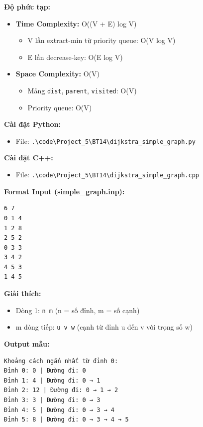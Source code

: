 \documentclass[12pt,a4paper]{article}
\begin{document}
\textbf{Độ phức tạp:}
\begin{itemize}[label=\textbullet]
   \item \textbf{Time Complexity:} O((V + E) log V)
   \begin{itemize}[label=\textendash]
       \item V lần extract-min từ priority queue: O(V log V)
       \item E lần decrease-key: O(E log V)
   \end{itemize}
   \item \textbf{Space Complexity:} O(V)
   \begin{itemize}[label=\textendash]
       \item Mảng \texttt{dist}, \texttt{parent}, \texttt{visited}: O(V)
       \item Priority queue: O(V)
   \end{itemize}
\end{itemize}

\textbf{Cài đặt Python:}
\begin{itemize}[label=\textbullet]
   \item File: \texttt{.\textbackslash code\textbackslash Project\_5\textbackslash BT14\textbackslash dijkstra\_simple\_graph.py}
\end{itemize}

\textbf{Cài đặt C++:}
\begin{itemize}[label=\textbullet]
   \item File: \texttt{.\textbackslash code\textbackslash Project\_5\textbackslash BT14\textbackslash dijkstra\_simple\_graph.cpp}
\end{itemize}
\newpage
\textbf{Format Input (simple\_graph.inp):}
\begin{verbatim}
6 7
0 1 4
1 2 8
2 5 2
0 3 3
3 4 2
4 5 3
1 4 5
\end{verbatim}

\textbf{Giải thích:}
\begin{itemize}[label=\textbullet]
   \item Dòng 1: \texttt{n m} (n = số đỉnh, m = số cạnh)
   \item m dòng tiếp: \texttt{u v w} (cạnh từ đỉnh u đến v với trọng số w)
\end{itemize}

\textbf{Output mẫu:}
\begin{verbatim}
Khoảng cách ngắn nhất từ đỉnh 0:
Đỉnh 0: 0 | Đường đi: 0
Đỉnh 1: 4 | Đường đi: 0 → 1
Đỉnh 2: 12 | Đường đi: 0 → 1 → 2
Đỉnh 3: 3 | Đường đi: 0 → 3
Đỉnh 4: 5 | Đường đi: 0 → 3 → 4
Đỉnh 5: 8 | Đường đi: 0 → 3 → 4 → 5
\end{verbatim}
\newpage
\end{document}
